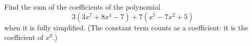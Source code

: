Find the sum of the coefficients of the polynomial
\[3\left(3x^7+8x^4-7\right)+7\left(x^5-7x^2+5\right)\]
when it is fully simplified. (The constant term counts as a coefficient: it is the coefficient of $x^0$.)
